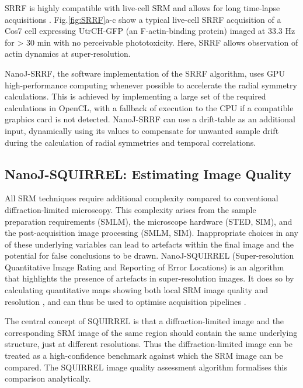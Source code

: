  SRRF is highly compatible with live-cell SRM and allows for long time-lapse acquisitions \cite{culley2018srrf}. Fig.\ref{fig:SRRF}a-c show a typical live-cell SRRF acquisition of a Cos7 cell expressing UtrCH-GFP (an F-actin-binding protein) imaged at 33.3 Hz for > 30 min with no perceivable phototoxicity. Here, SRRF allows observation of actin dynamics at super-resolution.
 
 NanoJ-SRRF, the software implementation of the SRRF algorithm, uses GPU high-performance computing whenever possible to accelerate the radial symmetry calculations. This is achieved by implementing a large set of the required calculations in OpenCL, with a fallback of execution to the CPU if a compatible graphics card is not detected. NanoJ-SRRF can use a drift-table as an additional input, dynamically using its values to compensate for unwanted sample drift during the calculation of radial symmetries and temporal correlations.

\subsection*{NanoJ-SQUIRREL: Estimating Image Quality}
All SRM techniques require additional complexity compared to conventional diffraction-limited microscopy. This complexity arises from the sample preparation requirements (SMLM), the microscope hardware (STED, SIM), and the post-acquisition image processing (SMLM, SIM). Inappropriate choices in any of these underlying variables can lead to artefacts within the final image and the potential for false conclusions to be drawn. NanoJ-SQUIRREL (Super-resolution Quantitative Image Rating and Reporting of Error Locations) is an algorithm that highlights the presence of artefacts in super-resolution images. It does so by calculating quantitative maps showing both local SRM image quality and resolution \cite{culley2018quantitative}, and can thus be used to optimise acquisition pipelines \cite{culley2018srrf}.

 The central concept of SQUIRREL is that a diffraction-limited image and the corresponding SRM image of the same region should contain the same underlying structure, just at different resolutions. Thus the diffraction-limited image can be treated as a high-confidence benchmark against which the SRM image can be compared. The SQUIRREL image quality assessment algorithm formalises this comparison analytically.

